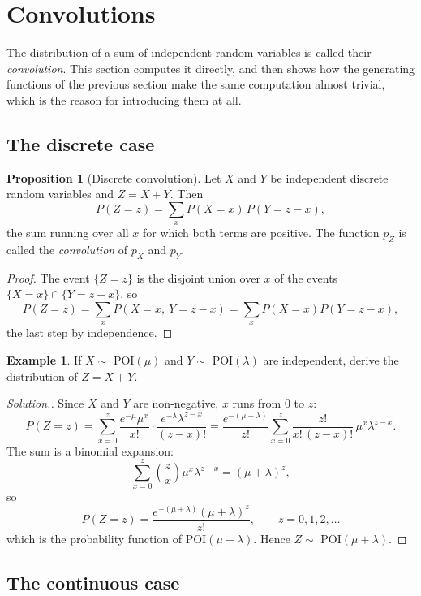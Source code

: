 \documentclass[11pt,a4paper]{article}
\theoremstyle{definition}
\newtheorem{exa}[thm]{Example}
\newtheorem{prop}[thm]{Proposition}
\newenvironment{solution}
  {\renewcommand{\qedsymbol}{}\begin{proof}[\textit{Solution}.]}
  {\end{proof}}
\begin{document}
\section{Convolutions}

The distribution of a sum of independent random variables is called their
\emph{convolution}. This section computes it directly, and then shows how the
generating functions of the previous section make the same computation almost
trivial, which is the reason for introducing them at all.

\subsection{The discrete case}

\begin{prop}[Discrete convolution]
Let $X$ and $Y$ be independent discrete random variables and $Z = X+Y$. Then
$$P(Z=z) = \sum_{x} P(X=x)\,P(Y=z-x),$$
the sum running over all $x$ for which both terms are positive. The function
$p_Z$ is called the \emph{convolution} of $p_X$ and $p_Y$.
\end{prop}

\begin{proof}
The event $\{Z=z\}$ is the disjoint union over $x$ of the events
$\{X=x\}\cap\{Y=z-x\}$, so
$$P(Z=z) = \sum_x P\left(X=x,\ Y=z-x\right) = \sum_x P(X=x)P(Y=z-x),$$
the last step by independence.
\end{proof}

\begin{exa}
If $X\sim$ POI$(\mu)$ and $Y\sim$ POI$(\lambda)$ are independent, derive the
distribution of $Z = X+Y$.
\end{exa}

\begin{solution}
Since $X$ and $Y$ are non-negative, $x$ runs from $0$ to $z$:
$$P(Z=z) = \sum_{x=0}^{z}\frac{e^{-\mu}\mu^{x}}{x!}\cdot
\frac{e^{-\lambda}\lambda^{z-x}}{(z-x)!}
= \frac{e^{-(\mu+\lambda)}}{z!}\sum_{x=0}^{z}\frac{z!}{x!\,(z-x)!}\,\mu^{x}\lambda^{z-x}.$$
The sum is a binomial expansion:
$$\sum_{x=0}^{z}\binom{z}{x}\mu^{x}\lambda^{z-x} = (\mu+\lambda)^{z},$$
so
$$P(Z=z) = \frac{e^{-(\mu+\lambda)}(\mu+\lambda)^{z}}{z!},\qquad z=0,1,2,\dots$$
which is the probability function of POI$(\mu+\lambda)$. Hence
$Z\sim$ POI$(\mu+\lambda)$.
\end{solution}

\subsection{The continuous case}
\end{document}
